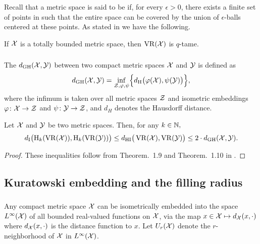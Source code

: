 \subsubsection{}

Recall that a metric space is said to be  if, for every $\epsilon > 0$, there exists a finite set of points in such that the entire space can be covered by the union of $\epsilon$-balls centered at these points.
As stated in \cite[Prop.~5.1]{chazal2014geometric} we have the following.

\medskip\lemma
If $\cX$ is a totally bounded metric space, then $\VR(\cX)$ is $q$-tame.

\subsubsection{}\label{thm:stability-HI}

The  $\dgh(\cX, \cY)$ between two compact metric spaces $\cX$ and $\cY$ is defined as
\[
\dgh(\cX, \cY) = \inf_{\cZ, \varphi, \psi} \set[\Big]{d_\rH\big(\varphi(\cX), \psi(\cY)\big)},
\]
where the infimum is taken over all metric spaces $\cZ$ and isometric embeddings $\varphi \colon \cX \to \cZ$ and $\psi \colon \cY \to \cZ$, and $d_H$ denotes the Hausdorff distance.

\medskip\theorem Let $\cX$ and $\cY$ be two metric spaces.
Then, for any $k \in \N,$
\[
\di\big(\rH_k(\VR(\cX)), \rH_k(\VR(\cY))\big) \leq
\dhi\big(\VR(\cX), \VR(\cY)\big) \leq
2 \cdot \dgh(\cX, \cY).
\]

\begin{proof}
	These inequalities follow from Theorem.~1.9 and Theorem.~1.10 in \cite{blumberg2023interleaving}.
\end{proof}

\subsection{Kuratowski embedding and the filling radius}

\subsubsection{}\label{ss:kuratowski}

Any compact metric space $\cX$ can be isometrically embedded into the space $L^\infty(\cX)$ of all bounded real-valued functions on $\cX$, via the map $x \in \cX \mapsto d_\cX(x,\cdot)$ where $d_\cX(x,\cdot)$ is the distance function to $x$.
Let $U_r(\cX)$ denote the $r$-neighborhood of $\cX$ in $L^\infty(\cX)$.

